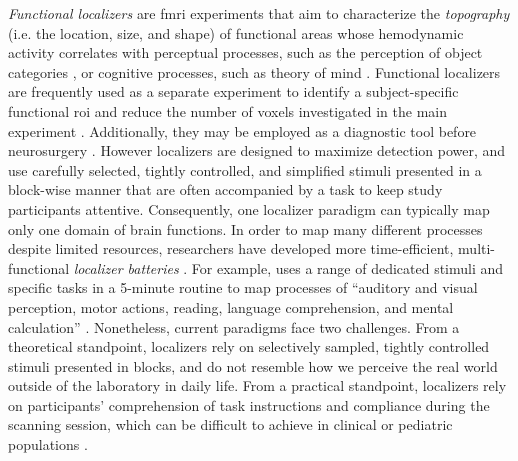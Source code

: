 

\textit{Functional localizers} \citep[s.][for reviews]{saxe2006divide,
friston2006critique} are \ac{fmri} experiments that aim to characterize the
\textit{topography} (i.e. the location, size, and shape) of functional areas
whose hemodynamic activity correlates with perceptual processes, such as the
perception of object categories \citep{kanwisher1997ffa}, or cognitive
processes, such as theory of mind \citep{spunt2014validating}.
Functional localizers are frequently used as a separate experiment to identify a
subject-specific functional \ac{roi} and reduce the number of voxels
investigated in the main experiment \citep{poldrack2007region, saxe2006divide}.
Additionally, they may be employed as a diagnostic tool before neurosurgery
\citep[cf.][]{silva2018challenges, szaflarski2017practice}.
However localizers are designed to maximize detection power, and use carefully
selected, tightly controlled, and simplified stimuli presented in a block-wise
manner that are often accompanied by a task to keep study participants
attentive.
Consequently, one localizer paradigm can typically map only one domain of brain
functions.
In order to map many different processes despite limited resources, researchers
have developed more time-efficient, multi-functional \textit{localizer
batteries} \citep[e.g.,][]{barch2013function, drobyshevsky2006rapid,
pinho2018individual, pinho2020individual, pinel2007fast}.
For example, \citet{pinel2007fast} uses a range of dedicated stimuli and
specific tasks in a 5-minute routine to map processes of ``auditory and visual
perception, motor actions, reading, language comprehension, and mental
calculation'' \citep[][p. 15]{pinel2007fast}.
Nonetheless, current paradigms face two challenges.
From a theoretical standpoint, localizers rely on selectively sampled, tightly
controlled stimuli presented in blocks, and do not resemble how we perceive the
real world outside of the laboratory in daily life.
From a practical standpoint, localizers rely on participants' comprehension of
task instructions and compliance during the scanning session, which can be
difficult to achieve in clinical or pediatric populations
\citep{eickhoff2020towards, vanderwal2015inscapes, vanderwal2019movies}.


